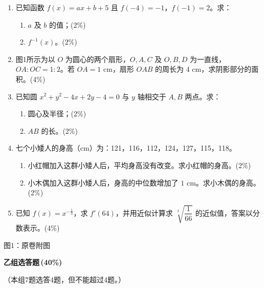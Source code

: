 \documentclass[12pt,a4paper]{exam-zh}
\begin{document}
\begin{enumerate}[leftmargin=2.2em,label=\arabic*.]
\item 已知函数 $f(x)=ax+b+5$ 且 $f(-4)=-1$，$f(-1)=2$。求：
  \begin{enumerate}[label=(\alph*),leftmargin=2em]
    \item $a$ 及 $b$ 的值；\hfill (2\%)
    \item $f^{-1}(x)$。\hfill (2\%)
  \end{enumerate}

\item 图1所示为以 $O$ 为圆心的两个扇形，$O,A,C$ 及 $O,B,D$ 为一直线，$OA:OC=1:2$。若 $OA=1\text{ cm}$，扇形 $OAB$ 的周长为 $4\text{ cm}$，求阴影部分的面积。\hfill (4\%)

\item 已知圆 $x^2+y^2-4x+2y-4=0$ 与 $y$ 轴相交于 $A,B$ 两点。求：
  \begin{enumerate}[label=(\alph*),leftmargin=2em]
    \item 圆心及半径；\hfill (2\%)
    \item $AB$ 的长。\hfill (2\%)
  \end{enumerate}

\item 七个小矮人的身高（cm）为：121，116，112，124，127，115，118。
  \begin{enumerate}[label=(\alph*),leftmargin=2em]
    \item 小红帽加入这群小矮人后，平均身高没有改变。求小红帽的身高。\hfill (2\%)
    \item 小木偶加入这群小矮人后，身高的中位数增加了 $1\text{ cm}$。求小木偶的身高。\hfill (2\%)
  \end{enumerate}

\item 已知 $f(x)=x^{-\frac13}$，求 $f'(64)$，并用近似计算求 $\sqrt[3]{\dfrac1{66}}$ 的近似值，答案以分数表示。\hfill (4\%)
\end{enumerate}

\vfill
\begin{flushright}图1：原卷附图\end{flushright}

\newpage

{\bfseries 乙组\quad 选答题\,(40\%)}\par
（本组7题选答4题，但不能超过4题。）
\end{document}
